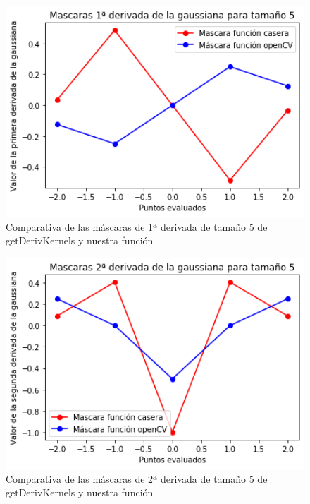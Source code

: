 \documentclass[12pt,spanish]{article}
\begin{document}
\begin{figure}[H]
	\centering
	\includegraphics[width=12cm, scale=1]{./imagenes_memoria/1d_t5.png}
	\caption{Comparativa de las máscaras de 1ª derivada de tamaño 5 de getDerivKernels y nuestra función}
	\label{mask_1d_t5}
\end{figure}

\begin{figure}[H]
	\centering
	\includegraphics[width=12cm]{./imagenes_memoria/2d_t5.png}
	\caption{Comparativa de las máscaras de 2ª derivada de tamaño 5 de getDerivKernels y nuestra función}
	\label{mask_2d_t5}
\end{figure}
\end{document}
